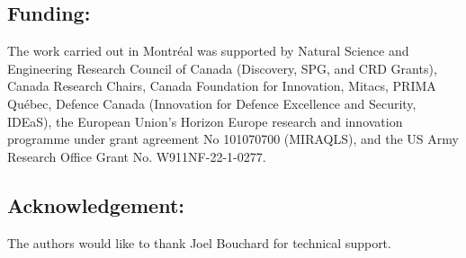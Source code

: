 \subsection{Funding:}
\noindent The work carried out in Montréal was supported by Natural Science and Engineering Research Council of Canada (Discovery, SPG, and CRD Grants), Canada Research Chairs, Canada Foundation for Innovation, Mitacs, PRIMA Québec, Defence Canada (Innovation for Defence Excellence and Security, IDEaS), the European Union's Horizon Europe research and innovation programme under grant agreement No 101070700 (MIRAQLS), and the US Army Research Office Grant No. W911NF-22-1-0277. 
\subsection{Acknowledgement:} The authors would like to thank Joel Bouchard for technical support.

